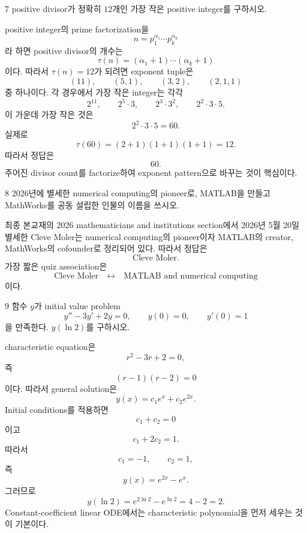 \begin{problem}{7}
positive divisor가 정확히 $12$개인 가장 작은 positive integer를 구하시오.
\end{problem}

\begin{solution}
positive integer의 prime factorization을
\[
    n=p_1^{\alpha_1}\cdots p_k^{\alpha_k}
\]
라 하면 positive divisor의 개수는
\[
    \tau(n)=(\alpha_1+1)\cdots(\alpha_k+1)
\]
이다. 따라서 $\tau(n)=12$가 되려면 exponent tuple은
\[
    (11),
    \qquad
    (5,1),
    \qquad
    (3,2),
    \qquad
    (2,1,1)
\]
중 하나이다. 각 경우에서 가장 작은 integer는 각각
\[
    2^{11},
    \qquad
    2^5\cdot3,
    \qquad
    2^3\cdot3^2,
    \qquad
    2^2\cdot3\cdot5.
\]
이 가운데 가장 작은 것은
\[
    2^2\cdot3\cdot5=60.
\]
실제로
\[
    \tau(60)=(2+1)(1+1)(1+1)=12.
\]
따라서 정답은
\[
    \boxed{60}.
\]
주어진 divisor count를 factorize하여 exponent pattern으로 바꾸는 것이 핵심이다.
\end{solution}

\begin{problem}{8}
2026년에 별세한 numerical computing의 pioneer로, MATLAB을 만들고 MathWorks를 공동 설립한 인물의 이름을 쓰시오.
\end{problem}

\begin{solution}
최종 본교재의 2026 mathematicians and institutions section에서 2026년 5월 20일 별세한 Cleve Moler는 numerical computing의 pioneer이자 MATLAB의 creator, MathWorks의 cofounder로 정리되어 있다. 따라서 정답은
\[
    \boxed{\text{Cleve Moler}}.
\]
가장 짧은 quiz association은
\[
    \text{Cleve Moler}
    \quad\longleftrightarrow\quad
    \text{MATLAB and numerical computing}
\]
이다.
\end{solution}

\begin{problem}{9}
함수 $y$가 initial value problem
\[
    y''-3y'+2y=0,
    \qquad
    y(0)=0,
    \qquad
    y'(0)=1
\]
을 만족한다. $y(\ln 2)$를 구하시오.
\end{problem}

\begin{solution}
characteristic equation은
\[
    r^2-3r+2=0,
\]
즉
\[
    (r-1)(r-2)=0
\]
이다. 따라서 general solution은
\[
    y(x)=c_1e^x+c_2e^{2x}.
\]
Initial conditions를 적용하면
\[
    c_1+c_2=0
\]
이고
\[
    c_1+2c_2=1.
\]
따라서
\[
    c_1=-1,
    \qquad
    c_2=1,
\]
즉
\[
    y(x)=e^{2x}-e^x.
\]
그러므로
\[
    y(\ln2)
    =e^{2\ln2}-e^{\ln2}
    =4-2
    =\boxed{2}.
\]
Constant-coefficient linear ODE에서는 characteristic polynomial을 먼저 세우는 것이 기본이다.
\end{solution}

